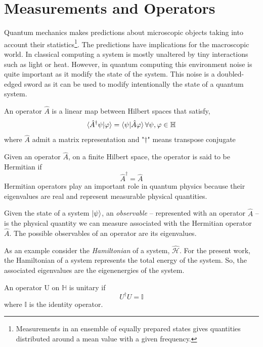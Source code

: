 \section{Measurements and Operators}
Quantum mechanics makes predictions about microscopic objects taking into account their statistics\footnote{Measurements in an ensemble of equally prepared states gives quantities distributed around a mean value with a given frequency.}. The predictions have implications for the macroscopic world. In classical computing a system is mostly unaltered by tiny interactions such as light or heat. However, in quantum computing this environment noise is quite important as it modify the state of the system. This noise is a doubled-edged sword as it can be used to modify intentionally the state of a quantum system.
\begin{definition}[Operator]
    An operator $\hat{A}$ is a linear map between Hilbert spaces that satisfy,
    \begin{equation}
        \braket{\hat{A}^{\dagger}\psi|\varphi} = \braket{\psi|\hat{A}\varphi} \forall \psi,\varphi \in \mathbb{H}
    \end{equation}
    where $\hat{A}$ admit a matrix representation and "$\dagger$" means transpose conjugate
\end{definition}
\begin{corollary}
    Given an operator $\hat{A}$, on a finite Hilbert space, the operator is said to be Hermitian if
    \begin{equation}
        \hat{A}^{\dagger} = \hat{A}
    \end{equation}
    Hermitian operators play an important role in quantum physics because their eigenvalues are real and represent measurable physical quantities.
\end{corollary}
\begin{definition}[Observable]
    Given the state of a system $\ket{\psi}$, an \textit{observable} -- represented with an operator $\hat{A}$ -- is the physical quantity we can measure associated with the Hermitian operator $\hat{A}$. The possible observables of an operator are its eigenvalues.
\end{definition}
As an example consider the \textit{Hamiltonian} of a system, $\hat{\mathcal{H}}$. For the present work, the Hamiltonian of a system represents the total energy of the system. So, the associated eigenvalues are the eigenenergies of the system.  
\begin{definition}
    An operator U on $\mathbb{H}$ is unitary if
    \begin{equation}
        U^{\dagger}U =\mathbb{I}
    \end{equation}
where $\mathbb{I}$ is the identity operator.
\end{definition}
